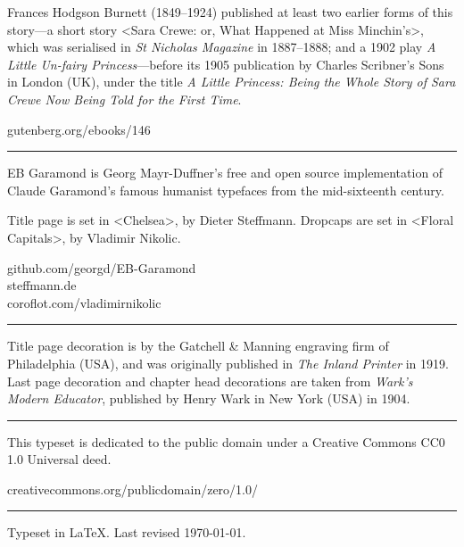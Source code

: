 \documentclass[
a5paper,
]{scrbook}
\begin{document}
\centering
\begin{minipage}{\textwidth}
Frances Hodgson Burnett (1849--1924) published at least two earlier forms of this story—a short story <Sara Crewe: or, What Happened at Miss Minchin's>, which was serialised in \textit{St Nicholas Magazine} in 1887--1888; and a 1902 play \textit{A Little Un-fairy Princess}—before its 1905 publication by Charles Scribner's Sons in London (UK), under the title \textit{A Little Princess: Being the Whole Story of Sara Crewe Now Being Told for the First Time}.
\end{minipage}
\vfill
gutenberg.org/ebooks/146
\vfill
\rule{0.5\textwidth}{.4pt}
\vfill
\begin{minipage}{\textwidth}
EB Garamond is Georg Mayr-Duffner's free and open source implementation of Claude Garamond’s famous humanist typefaces from the mid-sixteenth century. 
\end{minipage}
\vfill
\begin{minipage}{\textwidth}
Title page is set in <Chelsea>, by Dieter Steffmann. Dropcaps are set in <Floral Capitals>, by Vladimir Nikolic.
\end{minipage}
\vfill
github.com/georgd/EB-Garamond\\
steffmann.de\\
coroflot.com/vladimirnikolic
\vfill
\rule{0.5\textwidth}{.4pt}
\vfill
\begin{minipage}{\textwidth}
Title page decoration is by the Gatchell \& Manning engraving firm of Philadelphia (USA), and was originally published in \textit{The Inland Printer} in 1919. Last page decoration and chapter head decorations are taken from \textit{Wark's Modern Educator}, published by Henry Wark in New York (USA) in 1904.
\end{minipage}
\vfill
\rule{0.5\textwidth}{.4pt}
\vfill
\begin{minipage}{\textwidth}
This typeset is dedicated to the public domain under a Creative Commons CC0 1.0 Universal deed.\end{minipage}
\vfill
creativecommons.org/publicdomain/zero/1.0/
\vfill
\rule{0.5\textwidth}{.4pt}
\vfill
Typeset in \LaTeX{}. Last revised \today.
\thispagestyle{empty}
\end{document}
